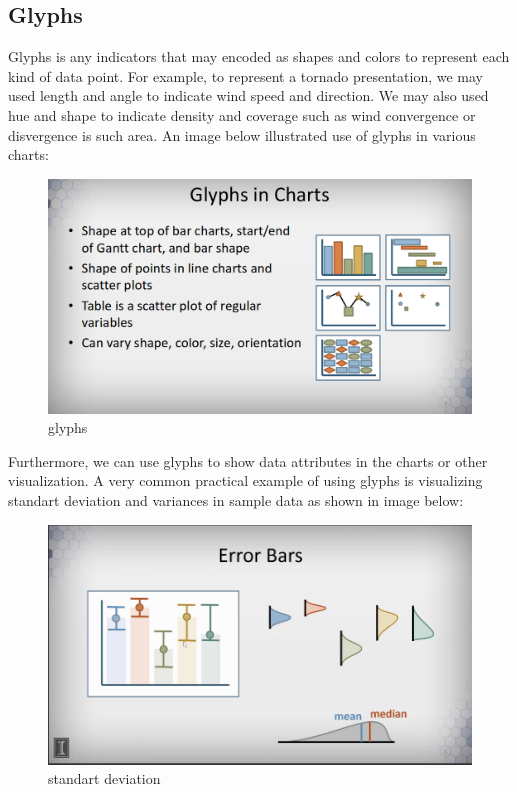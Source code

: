 \documentclass[11pt]{article}
\makeatletter
\def\maxwidth{\ifdim\Gin@nat@width>\linewidth\linewidth
    \else\Gin@nat@width\fi}
\let\Oldincludegraphics\includegraphics
\renewcommand{\includegraphics}[1]{\Oldincludegraphics[width=.8\maxwidth]{#1}}
\makeatother
\begin{document}
    \subsection{Glyphs}\label{glyphs}

Glyphs is any indicators that may encoded as shapes and colors to
represent each kind of data point. For example, to represent a tornado
presentation, we may used length and angle to indicate wind speed and
direction. We may also used hue and shape to indicate density and
coverage such as wind convergence or disvergence is such area. An image
below illustrated use of glyphs in various charts:

\begin{figure}
\centering
\includegraphics{images/glyphs-in-charts.png}
\caption{glyphs}
\end{figure}

Furthermore, we can use glyphs to show data attributes in the charts or
other visualization. A very common practical example of using glyphs is
visualizing standart deviation and variances in sample data as shown in
image below:

\begin{figure}
\centering
\includegraphics{images/glyphs-standart-deviation.png}
\caption{standart deviation}
\end{figure}
\end{document}
